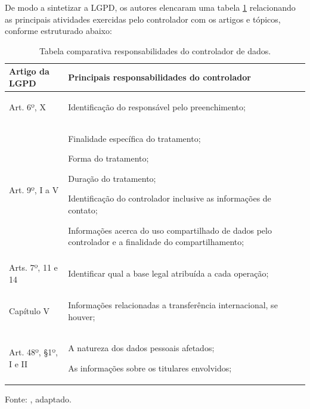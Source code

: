 \documentclass[
	12pt,				%
	openright,			%
	oneside,			%
	a4paper,			%
	english,			%
	french,				%
	spanish,			%
	brazil,				%
	]{abntex2}
\begin{document}
De modo a sintetizar a LGPD, os autores  elencaram uma tabela \ref{tab: responsabilidades do controlador} relacionando as principais atividades exercidas pelo controlador com os artigos e tópicos, conforme estruturado abaixo:

\begin{table}[ht]
    \centering
    \caption{Tabela comparativa responsabilidades do controlador de dados.}
    \label{tab: responsabilidades do controlador}
    \begin{tabular}{|p{4 cm}|p{11.5cm}|p{0cm}|} 
        \hline

        \textbf{Artigo da LGPD} & \textbf{Principais responsabilidades do controlador}  \\ \hline

Art. 6º, X
&
\begin{tabitemize}
\item Identificação do responsável pelo preenchimento;
\end{tabitemize}\\ \hline
Art. 9º, I a V
&
\begin{tabitemize}
\item Finalidade específica do tratamento;
\item Forma do tratamento;
\item Duração do tratamento;
\item Identificação do controlador inclusive as informações de contato;
\item Informações acerca do uso compartilhado de dados pelo controlador e a finalidade do compartilhamento;
\end{tabitemize} \\ \hline
Arts. 7º, 11 e 14
&
\begin{tabitemize}
\item Identificar qual a base legal atribuída a cada operação;
\end{tabitemize}\\ \hline

Capítulo V
&
\begin{tabitemize}
\item Informações relacionadas a transferência internacional, se houver;
\end{tabitemize}\\ \hline

Art. 48º, §1º, I e II
&
\begin{tabitemize}
\item A natureza dos dados pessoais afetados;
\item As informações sobre os titulares envolvidos;
\end{tabitemize}\\ \hline

 
    \end{tabular}
    \newline \newline Fonte: \cite{furtado2020}, adaptado.
\end{table}
\end{document}
